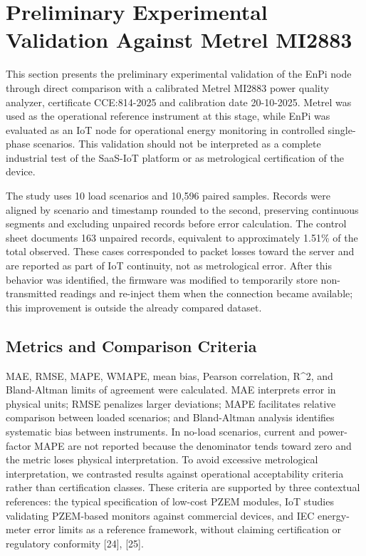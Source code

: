 \documentclass{ieeeaccess}
\begin{document}
\section{Preliminary Experimental Validation Against Metrel MI2883}
\label{sec:metrel-validation}

This section presents the preliminary experimental validation of the EnPi node through direct comparison with a calibrated Metrel MI2883 power quality analyzer, certificate CCE:814-2025 and calibration date 20-10-2025. Metrel was used as the operational reference instrument at this stage, while EnPi was evaluated as an IoT node for operational energy monitoring in controlled single-phase scenarios. This validation should not be interpreted as a complete industrial test of the SaaS-IoT platform or as metrological certification of the device.

The study uses 10 load scenarios and 10,596 paired samples. Records were aligned by scenario and timestamp rounded to the second, preserving continuous segments and excluding unpaired records before error calculation. The control sheet documents 163 unpaired records, equivalent to approximately 1.51\% of the total observed. These cases corresponded to packet losses toward the server and are reported as part of IoT continuity, not as metrological error. After this behavior was identified, the firmware was modified to temporarily store non-transmitted readings and re-inject them when the connection became available; this improvement is outside the already compared dataset.

\subsection{Metrics and Comparison Criteria}
\label{subsec:metrics-criteria}

MAE, RMSE, MAPE, WMAPE, mean bias, Pearson correlation, R\textasciicircum{}2, and Bland-Altman limits of agreement were calculated. MAE interprets error in physical units; RMSE penalizes larger deviations; MAPE facilitates relative comparison between loaded scenarios; and Bland-Altman analysis identifies systematic bias between instruments. In no-load scenarios, current and power-factor MAPE are not reported because the denominator tends toward zero and the metric loses physical interpretation. To avoid excessive metrological interpretation, we contrasted results against operational acceptability criteria rather than certification classes. These criteria are supported by three contextual references: the typical specification of low-cost PZEM modules, IoT studies validating PZEM-based monitors against commercial devices, and IEC energy-meter error limits as a reference framework, without claiming certification or regulatory conformity [24], [25].
\end{document}
